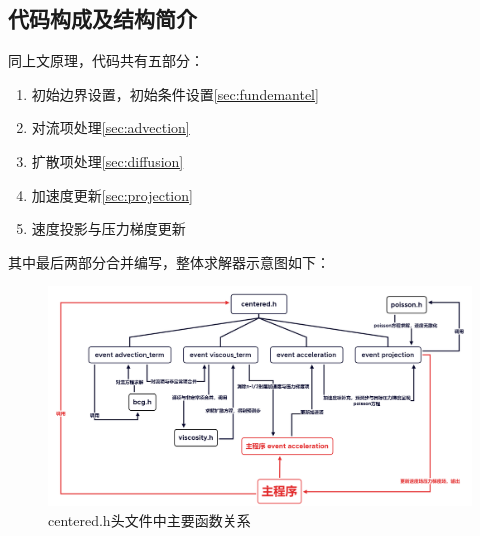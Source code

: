 \documentclass[lang=cn,11pt,a4paper]{elegantpaper}
\begin{document}
\subsection{代码构成及结构简介}
同上文原理，代码共有五部分：
\begin{enumerate}
    \item 初始边界设置，初始条件设置\ref{sec:fundemantel}
    \item 对流项处理\ref{sec:advection}
    \item 扩散项处理\ref{sec:diffusion}
    \item 加速度更新\ref{sec:projection}
    \item 速度投影与压力梯度更新
\end{enumerate}
其中最后两部分合并编写，整体求解器示意图如下：
\begin{figure}[h]
  \centering
  \includegraphics[width=1.0\textwidth]{centered.h.png}
  \caption{centered.h头文件中主要函数关系}
\end{figure}
\end{document}
